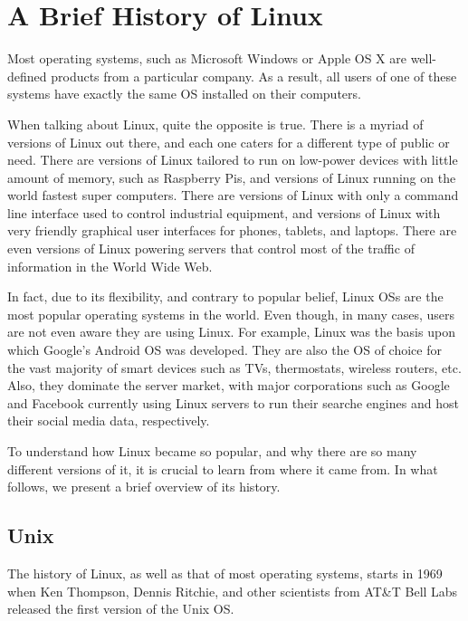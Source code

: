 \chapter{A Brief History of Linux}\label{ch:history}

Most operating systems, such as Microsoft Windows or Apple OS X are well-defined products from a particular company. As a result, all users of one of these systems have exactly the same \acs{OS} installed on their computers.

When talking about Linux, quite the opposite is true. There is a myriad of versions of Linux out there, and each one caters for a different type of public or need. There are versions of Linux tailored to run on low-power devices with little amount of memory, such as Raspberry Pis, and versions of Linux running on the world fastest super computers. There are versions of Linux with only a command line interface used to control industrial equipment, and versions of Linux with very friendly graphical user interfaces for phones, tablets, and laptops. There are even versions of Linux powering servers that control most of the traffic of information in the World Wide Web.

In fact, due to its flexibility, and contrary to popular belief, Linux \acs{OS}s are the most popular operating systems in the world. Even though, in many cases, users are not even aware they are using Linux. For example, Linux was the basis upon which Google's Android \acs{OS} was developed. They are also the \acs{OS} of choice for the vast majority of smart devices such as TVs, thermostats, wireless routers, etc. Also, they dominate the server market, with major corporations such as Google and Facebook currently using Linux servers to run their searche engines and host their social media data, respectively.

To understand how Linux became so popular, and why there are so many different versions of it, it is crucial to learn from where it came from. In what follows, we present a brief overview of its history.

\section{Unix}

The history of Linux, as well as that of most operating systems, starts in 1969 when Ken Thompson, Dennis Ritchie, and other scientists from AT\&T Bell Labs released the first version of the Unix \acs{OS}.

